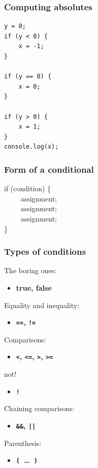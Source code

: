 \documentclass{beamer}
\begin{document}
\begin{frame}[fragile]
\frametitle{Computing absolutes}
\large

\begin{codeblock}
\begin{verbatim}
y = 0;
if (y < 0) {
    x = -1;
}

if (y == 0) {
    x = 0;
}

if (y > 0) {
    x = 1;
}
console.log(x);
\end{verbatim}
\end{codeblock}

\end{frame}

\begin{frame}[fragile]
\frametitle{Form of a conditional}
\large

{\Huge if (condition) \{}\\
{\Huge ~~~~ assignment; }\\
{\Huge ~~~~ assignment; }\\
{\Huge ~~~~ assignment; }\\
{\Huge \}}
\end{frame}


\begin{frame}[fragile]
\frametitle{Types of conditions}
\large
The boring ones:
\begin{itemize}
\item {\bf true, false}
\end{itemize}

Equality and inequality:
\begin{itemize}
\item {\bf \verb$==$, \verb$!=$}
\end{itemize}

Comparisons:
\begin{itemize}
\item {\bf \verb$<$, \verb$<=$, \verb$>$, \verb$>=$}
\end{itemize}

not!
\begin{itemize}
\item {\bf \verb$!$}
\end{itemize}

Chaining comparisons:
\begin{itemize}
\item {\bf \verb$&&$, \verb$||$}
\end{itemize}

Parenthesis:
\begin{itemize}
\item {\bf \verb$($~\ldots~\verb$)$}
\end{itemize}

\end{frame}
\end{document}
